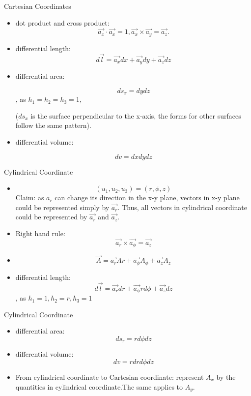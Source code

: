 \documentclass[xcolor={dvipsnames}]{beamer}
\begin{document}
\begin{frame}{Cartesian Coordinates}
\begin{itemize}
	\item dot product and cross product:
	$$\vec{a_x}\cdot\vec{a_x}=1,\vec{a_x}\times\vec{a_y}=\vec{a_z}.$$
    \item differential length:
    \begin{equation}\label{Eq: cartesian-differential-length}
        d\vec{l} = \vec{a_x}dx + \vec{a_y}dy + \vec{a_z}dz
    \end{equation}
    \item differential area:

    $$
    ds_x = dydz
    $$,
    as $h_1 = h_2 = h_3 = 1$,

    ($ds_x$ is the surface perpendicular to the x-axis, the forms for other surfaces follow the same pattern).
    \item differential volume:

    $$
    dv=dxdydz
    $$
\end{itemize}
\end{frame}
\begin{frame}{Cylindrical Coordinate}
\begin{itemize}
    \item $$(u_1, u_2, u_3) = (r, \phi, z)$$
    Claim: as $a_r$ can change its direction in the x-y plane, vectors in x-y plane could be represented simply by $\vec{a_r}$. Thus, all vectors in cylindrical coordinate could be represented by $\vec{a_r}$ and $\vec{a_z}$.

    \item Right hand rule: 
    $$\vec{a_r}\times\vec{a_\phi}=\vec{a_z}$$
    \item $$\vec{A} = \vec{a_r}Ar + \vec{a_\phi}A_\phi + \vec{a_z}A_z$$
    \item differential length:
    \begin{equation}\label{Eq: cylindrical-differential-length}
        d\vec{l} = \vec{a_r}dr + \vec{a_\phi}rd\phi + \vec{a_z}dz
    \end{equation},
    as $h_1 = 1, h_2 = r, h_3 = 1$
\end{itemize}
\end{frame}
\begin{frame}{Cylindrical Coordinate}
\begin{itemize}
    \item differential area: 
    $$
    ds_r = rd\phi dz
    $$

    \item differential volume:
    $$
    dv = rdrd\phi dz
    $$
    \item From cylindrical coordinate to Cartesian coordinate: represent $A_x$ by the quantities in cylindrical coordinate.The same applies to $A_y$.

\end{itemize}
\end{frame}
\end{document}
